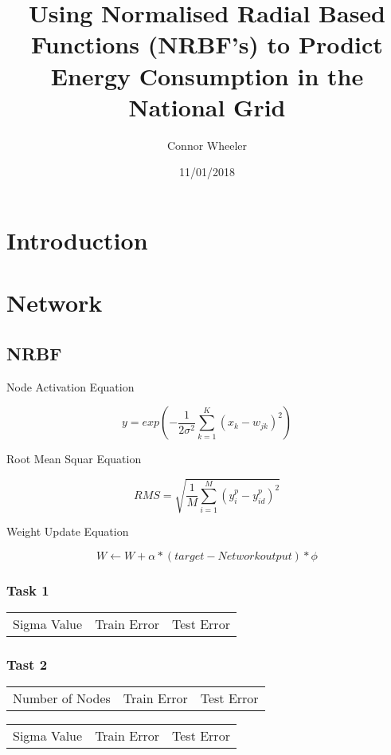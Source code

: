 \documentclass{IEEEtran}
\title{Using Normalised Radial Based Functions (NRBF's) to Prodict Energy Consumption in the National Grid}
\author{Connor Wheeler}
\date{11/01/2018}
\begin{document}

\maketitle

\newpage
\section{Introduction}
\section{Network}
\subsection{NRBF}
\begin{center}
  Node Activation Equation
\end{center}
$$y=exp(-\frac{1}{2\sigma^2} \sum_{k=1}^{K}(x_{k} - w_{jk})^2) $$
\begin{center}
  Root Mean Squar Equation
\end{center}
$$RMS =\sqrt{\frac{1}{M}\sum_{i=1}^{M}(y^{p}_{i} - y^{p}_{id})^2} $$
\begin{center}
Weight Update Equation
\end{center}
$$ W  \leftarrow W + \alpha *(target - Network output)*\phi$$
\subsubsection{Task 1}
\begin{center}
\begin{tabular}{||c c c||}
  \hline
Sigma Value & Train Error & Test Error \\ [0.5ex]
\end{tabular}
\end{center}
\subsubsection{Tast 2}
\begin{center}
\begin{tabular}{||c c c||}
  \hline
Number of Nodes & Train Error & Test Error \\ [0.5ex]
\end{tabular}
\end{center}
\begin{center}
\begin{tabular}{||c c c||}
  \hline
Sigma Value & Train Error & Test Error \\ [0.5ex]
\end{tabular}
\end{center}
\end{document}
